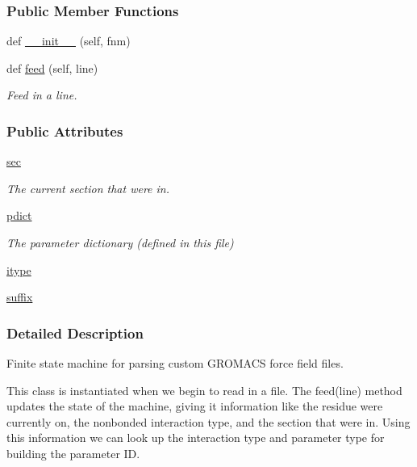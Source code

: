 \subsubsection*{Public Member Functions}
\begin{DoxyCompactItemize}
\item 
def \hyperlink{classsrc_1_1custom__io_1_1Gen__Reader_a51738eb886cd86e3ced2ab54cb39bcdf}{\+\_\+\+\_\+init\+\_\+\+\_\+} (self, fnm)
\item 
def \hyperlink{classsrc_1_1custom__io_1_1Gen__Reader_adee7b86d90da3818100d33975b8ec00e}{feed} (self, line)
\begin{DoxyCompactList}\small\item\em Feed in a line. \end{DoxyCompactList}\end{DoxyCompactItemize}
\subsubsection*{Public Attributes}
\begin{DoxyCompactItemize}
\item 
\hyperlink{classsrc_1_1custom__io_1_1Gen__Reader_af73e83d59f466c89f2fc03052fc6c2d7}{sec}
\begin{DoxyCompactList}\small\item\em The current section that we\textquotesingle{}re in. \end{DoxyCompactList}\item 
\hyperlink{classsrc_1_1custom__io_1_1Gen__Reader_a9a7fe7d452d1cf79db07bfe1185c3fec}{pdict}
\begin{DoxyCompactList}\small\item\em The parameter dictionary (defined in this file) \end{DoxyCompactList}\item 
\hyperlink{classsrc_1_1custom__io_1_1Gen__Reader_a8a0c59194fe084356f69746cc1388278}{itype}
\item 
\hyperlink{classsrc_1_1custom__io_1_1Gen__Reader_ada076d5cafe10b9f4fcf7466381816e5}{suffix}
\end{DoxyCompactItemize}


\subsubsection{Detailed Description}
Finite state machine for parsing custom G\+R\+O\+M\+A\+CS force field files. 

This class is instantiated when we begin to read in a file. The feed(line) method updates the state of the machine, giving it information like the residue we\textquotesingle{}re currently on, the nonbonded interaction type, and the section that we\textquotesingle{}re in. Using this information we can look up the interaction type and parameter type for building the parameter ID. 

